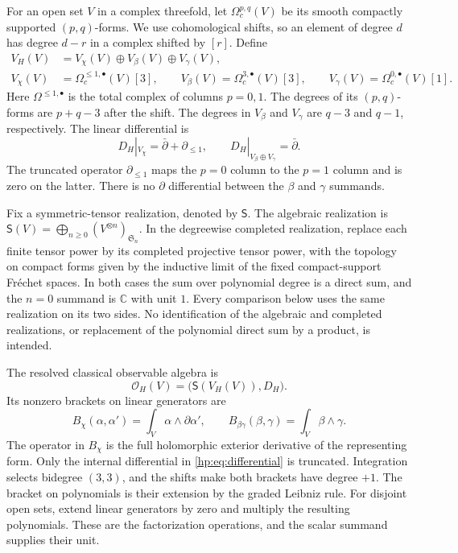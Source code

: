 For an open set $V$ in a complex threefold, let
$\Omega_c^{p,q}(V)$ be its smooth compactly supported $(p,q)$-forms.
We use cohomological shifts, so an element of degree $d$ has degree
$d-r$ in a complex shifted by $[r]$. Define
\begin{equation}\label{hp:eq:linear}
\begin{split}
 V_H(V)&=V_\chi(V)\oplus V_\beta(V)\oplus V_\gamma(V),\\
 V_\chi(V)&=\Omega_c^{\leq1,\bullet}(V)[3],\qquad
 V_\beta(V)=\Omega_c^{3,\bullet}(V)[3],\qquad
 V_\gamma(V)=\Omega_c^{0,\bullet}(V)[1].
\end{split}
\end{equation}
Here $\Omega^{\leq1,\bullet}$ is the total complex of columns
$p=0,1$. The degrees of its $(p,q)$-forms are $p+q-3$ after the
shift. The degrees in $V_\beta$ and $V_\gamma$ are $q-3$ and $q-1$,
respectively. The linear differential is
\begin{equation}\label{hp:eq:differential}
 D_H|_{V_\chi}=\bar\partial+\partial_{\leq1},\qquad
 D_H|_{V_\beta\oplus V_\gamma}=\bar\partial.
\end{equation}
The truncated operator $\partial_{\leq1}$ maps the $p=0$ column
to the $p=1$ column and is zero on the latter. There is no
$\partial$ differential between the $\beta$ and $\gamma$ summands.

Fix a symmetric-tensor realization, denoted by $\mathsf S$.
The algebraic realization is
$\mathsf S(V)=\bigoplus_{n\geq0}(V^{\otimes n})_{\mathfrak S_n}$.
In the degreewise completed realization, replace each finite tensor
power by its completed projective tensor power, with the topology on
compact forms given by the inductive limit of the fixed compact-support
Fr\'echet spaces. In both cases the sum over polynomial degree is a
direct sum, and the $n=0$ summand is $\mathbb C$ with unit $1$.
Every comparison below uses the same realization on its two sides.
No identification of the algebraic and completed realizations, or
replacement of the polynomial direct sum by a product, is intended.

The resolved classical observable algebra is
\begin{equation}\label{hp:eq:observables}
 \mathcal O_H(V)=\bigl(\mathsf S(V_H(V)),D_H\bigr).
\end{equation}
Its nonzero brackets on linear generators are
\begin{equation}\label{hp:eq:brackets}
 B_\chi(\alpha,\alpha')=\int_V\alpha\wedge\partial\alpha',
 \qquad
 B_{\beta\gamma}(\beta,\gamma)=\int_V\beta\wedge\gamma.
\end{equation}
The operator in $B_\chi$ is the full holomorphic exterior derivative
of the representing form. Only the internal differential in
\eqref{hp:eq:differential} is truncated. Integration selects bidegree
$(3,3)$, and the shifts make both brackets have degree $+1$.
The bracket on polynomials is their extension by the graded Leibniz
rule. For disjoint open sets, extend linear generators by zero and
multiply the resulting polynomials. These are the factorization
operations, and the scalar summand supplies their unit.

